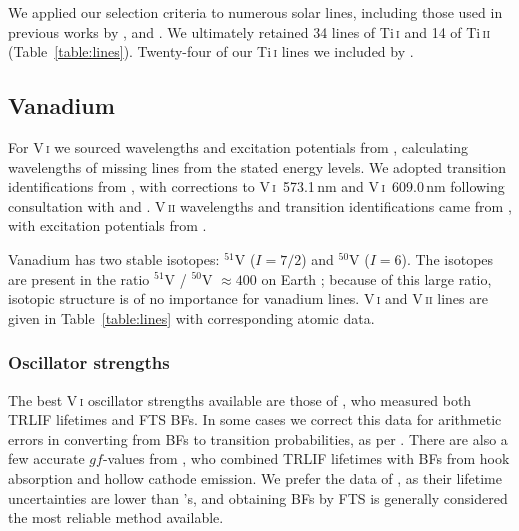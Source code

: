 \documentclass[traditabstract]{aa}
\begin{document}
We applied our selection criteria to numerous solar lines, including those used in previous works by \citet{Blackwell87}, \citet{Reddy03} and \citet{Bizzarri93}.  We ultimately retained 34 lines of Ti\,\textsc{i} and 14 of Ti\,\textsc{ii} (Table~\ref{table:lines}). Twenty-four of our Ti\,\textsc{i} lines we included by \citet{Lawler13}.

\subsection{Vanadium}
\label{Vatomicdata}

For V\,\textsc{i} we sourced wavelengths and excitation potentials from \citet{Davis78b}, calculating wavelengths of missing lines from the stated energy levels.  We adopted transition identifications from \citet{Whaling85}, with corrections to \mbox{V\,\textsc{i} 573.1\,nm} and \mbox{V\,\textsc{i} 609.0\,nm} following consultation with \citeauthor{Davis78b} and \citet{Martin88}.  V\,\textsc{ii} wavelengths and transition identifications came from \citet{Biemont89}, with excitation potentials from \citet{Sugar85}.

Vanadium has two stable isotopes: $^{51}$V ($I=7/2$) and $^{50}$V ($I=6$).  The isotopes are
present in the ratio $^{51}$V / $^{50}$V $\approx 400$ on Earth \citep{IUPAC98}; because of this large ratio, isotopic structure is of no
importance for vanadium lines.  V\,\textsc{i} and V\,\textsc{ii} lines are given in Table~\ref{table:lines} with corresponding atomic data.

\subsubsection{Oscillator strengths}
\label{Vgfs}

The best V\,\textsc{i} oscillator strengths available are those of \citet{Whaling85}, who measured both TRLIF lifetimes
and FTS BFs.   
In some cases we correct
this data for arithmetic errors in converting from BFs to transition probabilities, as per \citet{Martin88}.  There are
also a few accurate $gf$-values from \citet{Doerr85b}, who combined TRLIF lifetimes with BFs from hook absorption and hollow
cathode emission.  We prefer the data of \citet{Whaling85}, as their lifetime uncertainties are lower than
\citeauthor{Doerr85b}'s, and obtaining BFs by FTS is generally considered the most reliable method available.
\end{document}
